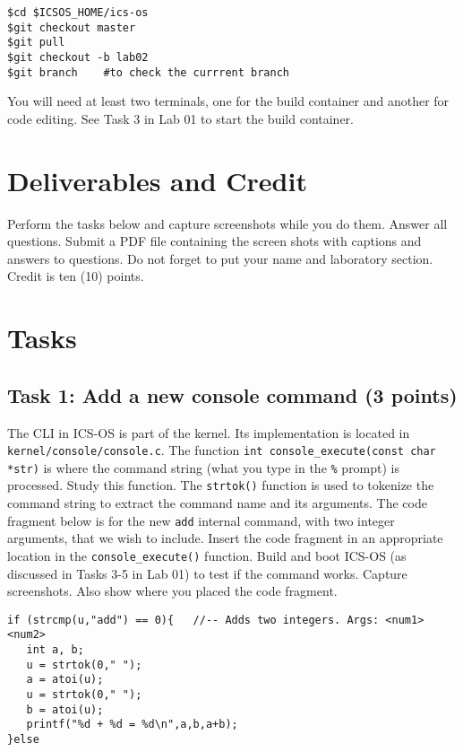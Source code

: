 \documentclass[a4paper, 11pt,oneside]{article}
\begin{document}
\begin{verbatim}
$cd $ICSOS_HOME/ics-os
$git checkout master
$git pull
$git checkout -b lab02
$git branch    #to check the currrent branch
\end{verbatim}

You will need at least two terminals, one for the build container and another 
for code editing. See Task 3 in Lab 01 to start the build container.

\section{Deliverables and Credit}
Perform the tasks below and capture screenshots while you do them. Answer
all questions. Submit a PDF file containing the screen shots with captions
and answers to questions. Do not forget to put your name and laboratory
section.  Credit is ten (10) points.

\section{Tasks}

\subsection*{Task 1: Add a new console command (3 points)} 
The CLI in ICS-OS is part of the kernel. Its implementation is located in
\texttt{kernel/console/console.c}. The function \texttt{int 
console\_execute(const char *str)} is where the command string (what you type
in the \texttt{\%} prompt) is processed. Study this function. The 
\texttt{strtok()} function is used to tokenize the command string to extract
the command name and its arguments. The code fragment below is for the new
\texttt{add} internal command, with two integer arguments, that we wish to 
include. Insert the code fragment in an appropriate location in the 
\texttt{console\_execute()} function. Build and boot ICS-OS (as discussed in 
Tasks 3-5 in Lab 01) to test if the command works. Capture screenshots. Also 
show where you placed the code fragment. 

\begin{verbatim}
if (strcmp(u,"add") == 0){   //-- Adds two integers. Args: <num1> <num2> 
   int a, b; 
   u = strtok(0," "); 
   a = atoi(u);
   u = strtok(0," "); 
   b = atoi(u); 
   printf("%d + %d = %d\n",a,b,a+b); 
}else
\end{verbatim}
\end{document}
